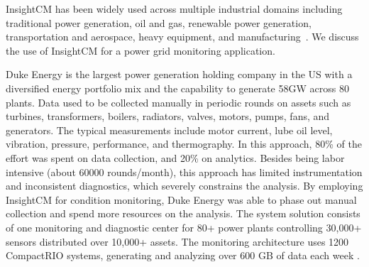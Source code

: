 InsightCM has been widely used across multiple industrial domains including traditional power generation, oil and gas, renewable power generation, transportation and aerospace, heavy equipment, and manufacturing~\cite{MCM_UC_NI}. We discuss the use of InsightCM for a power grid monitoring application.

Duke Energy \cite{dukewebsite} is the largest power generation holding company in the US with a diversified energy portfolio mix and the capability to generate 58GW across 80 plants. Data used to be collected manually in periodic rounds on assets such as turbines, transformers, boilers, radiators, valves, motors, pumps, fans, and generators. The typical measurements include motor current, lube oil level, vibration, pressure, performance, and thermography. In this approach, 80\% of the effort was spent on data collection, and 20\% on analytics. Besides being labor intensive (about 60000 rounds/month), this approach has limited instrumentation and inconsistent diagnostics, which severely constrains the analysis.
By employing InsightCM for condition monitoring, Duke Energy was able to phase out manual collection and spend more resources on the analysis. 
The system solution consists of one monitoring and diagnostic center for 80+ power plants controlling 30,000+ sensors distributed over 10,000+ assets. The  monitoring architecture uses 1200 CompactRIO systems, generating and analyzing over 600 GB of data each week \cite{duke}.



